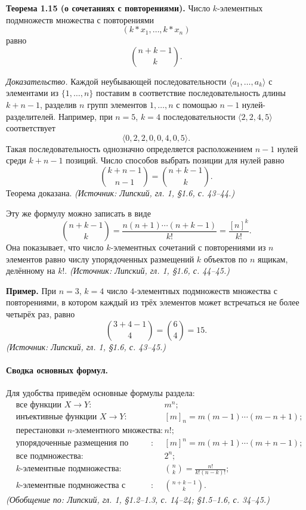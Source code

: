 \documentclass[a4paper,12pt]{article}
\begin{document}
\textbf{Теорема 1.15 (о сочетаниях с повторениями).} Число \(k\)-элементных подмножеств множества с повторениями
\[
(k*x_1,\dots,k*x_n)
\]
равно
\[
\binom{n+k-1}{k}.
\]

\emph{Доказательство.} Каждой неубывающей последовательности \(\langle a_1,\dots,a_k\rangle\) с элементами из \(\{1,\dots,n\}\) поставим в соответствие последовательность длины \(k+n-1\), разделив \(n\) групп элементов \(1,\dots,n\) с помощью \(n-1\) нулей-разделителей. Например, при \(n=5\), \(k=4\) последовательности \(\langle 2,2,4,5\rangle\) соответствует
\[
\langle 0,2,2,0,0,4,0,5\rangle.
\]
Такая последовательность однозначно определяется расположением \(n-1\) нулей среди \(k+n-1\) позиций. Число способов выбрать позиции для нулей равно
\[
\binom{k+n-1}{n-1}=\binom{n+k-1}{k}.
\]
Теорема доказана.
\textit{(Источник: Липский, гл. 1, §1.6, с. 43--44.)}

Эту же формулу можно записать в виде
\[
\binom{n+k-1}{k}=\frac{n(n+1)\cdots(n+k-1)}{k!}=\frac{[n]^k}{k!}.
\]
Она показывает, что число \(k\)-элементных сочетаний с повторениями из \(n\) элементов равно числу упорядоченных размещений \(k\) объектов по \(n\) ящикам, делённому на \(k!\).
\textit{(Источник: Липский, гл. 1, §1.6, с. 44--45.)}

\textbf{Пример.} При \(n=3\), \(k=4\) число \(4\)-элементных подмножеств множества с повторениями, в котором каждый из трёх элементов может встречаться не более четырёх раз, равно
\[
\binom{3+4-1}{4}=\binom{6}{4}=15.
\]
\textit{(Источник: Липский, гл. 1, §1.6, с. 43--45.)}

\paragraph{Сводка основных формул.}
Для удобства приведём основные формулы раздела:
\[
\begin{aligned}
&\text{все функции }X\to Y: && m^n;\\
&\text{инъективные функции }X\to Y: && [m]_n=m(m-1)\cdots(m-n+1);\\
&\text{перестановки }n\text{-элементного множества}: && n!;\\
&\text{упорядоченные размещения по ящикам}: && [m]^n=m(m+1)\cdots(m+n-1);\\
&\text{все подмножества}: && 2^n;\\
&\text{\(k\)-элементные подмножества}: && \binom{n}{k}=\frac{n!}{k!(n-k)!};\\
&\text{\(k\)-элементные подмножества с повторениями}: && \binom{n+k-1}{k}.
\end{aligned}
\]
\textit{(Обобщение по: Липский, гл. 1, §1.2--1.3, с. 14--24; §1.5--1.6, с. 34--45.)}
\end{document}
